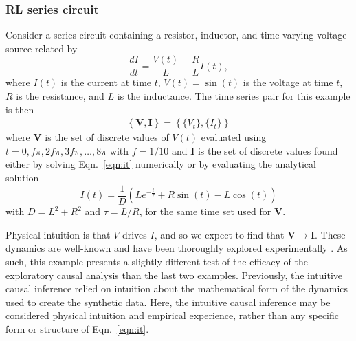 \documentclass{article}[10pt]
\begin{document}
\subsubsection{RL series circuit}
\label{sec:rlcirc}
Consider a series circuit containing a resistor, inductor, and time varying voltage source related by
\begin{equation}
\label{eqn:it}
\frac{dI}{dt} = \frac{V(t)}{L} - \frac{R}{L} I(t),
\end{equation}
where $I(t)$ is the current at time $t$, $V(t)= \sin\left(t\right)$ is the voltage at time $t$, $R$ is the resistance, and $L$ is the inductance.  The time series pair for this example is then 
\begin{eqnarray}
\label{eqn:RLcirceqn}
\left\{\mathbf{V},\mathbf{I}\right\} = \left\{\{V_t\},\{I_t\}\right\}
\end{eqnarray}
where $\mathbf{V}$ is the set of discrete values of $V(t)$ evaluated using $t=0,f\pi,2f\pi,3f\pi,\ldots,8\pi$ with $f=1/10$ and $\mathbf{I}$ is the set of discrete values found either by solving Eqn.\ \ref{eqn:it} numerically or by evaluating the analytical solution 
\begin{equation}
I(t) = \frac{1}{D}\left(Le^{-\frac{t}{\tau}}+R\sin(t)-L\cos(t)\right)
\end{equation}
with $D = L^2 + R^2$ and $\tau = L/R$, for the same time set used for $\mathbf{V}$.

Physical intuition is that $V$ drives $I$, and so we expect to find that $\mathbf{V}\rightarrow\mathbf{I}$.  These dynamics are well-known and have been thoroughly explored experimentally \cite{Halliday2010,Knight2012}.  As such, this example presents a slightly different test of the efficacy of the exploratory causal analysis than the last two examples.  Previously, the intuitive causal inference relied on intuition about the mathematical form of the dynamics used to create the synthetic data.  Here, the intuitive causal inference may be considered physical intuition and empirical experience, rather than any specific form or structure of Eqn.\ \ref{eqn:it}.    
\end{document}
